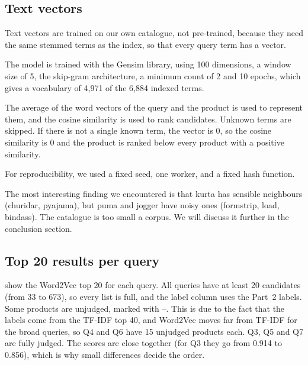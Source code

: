 \documentclass[11pt,a4paper]{article}
\begin{document}
\subsection{Text vectors}


Text vectors are trained on our own catalogue, not pre-trained, because they need the same stemmed
terms as the index, so that every query term has a vector.


The model is trained with the Gensim library, using 100 dimensions, a window size of 5, the skip-gram architecture, a minimum count of 2
and 10 epochs, which gives a vocabulary of 4,971 of the 6,884 indexed terms.


The average of the word vectors of the query and the product is used to represent them, and
the cosine similarity is used to rank candidates. Unknown terms are skipped. If there is not a single known term,
the vector is 0, so the cosine similarity is 0 and the product is ranked below every product with a positive similarity.

For reproducibility, we used a fixed seed, one worker, and a fixed hash function.

The most interesting finding we encountered is that kurta has sensible neighbours (churidar, pyajama),
but puma and jogger have noisy ones (formstrip, load, bindass). The catalogue is too small a corpus.
We will discuss it further in the conclusion section.

\subsection{Top 20 results per query}

 show the Word2Vec top 20 for each query. All queries have at least 20 candidates (from 33 to 673), so every list is full, and the
label column uses the Part~2 labels. Some products are unjudged, marked with --. This is due to the fact
that the labels come from the TF-IDF top 40, and Word2Vec moves far from TF-IDF for the broad queries, so Q4 and Q6 have 15 unjudged products each. Q3, Q5 and Q7 are fully judged.
The scores are close together (for Q3 they go from 0.914 to 0.856), which is why small differences decide the order.
\end{document}

